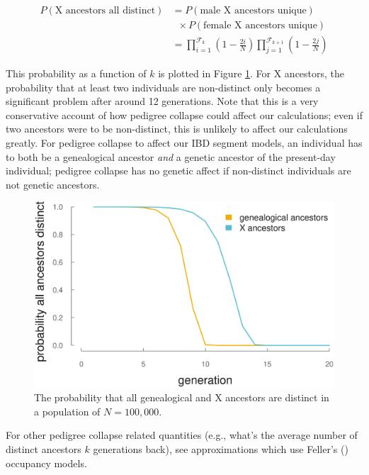 \documentclass[9pt,twocolumn,twoside]{gsajnl}
\begin{document}
\begin{align}
  P(\text{X ancestors all distinct}) &= P(\text{male X ancestors unique})  \\ \nonumber
  & \;\; \times P(\text{female X ancestors unique})\\ \nonumber
                                     &= \prod_{i=1}^{\mathcal{F}_{k}} \left(1-\frac{2i}{N}\right)\prod_{j=1}^{\mathcal{F}_{k+1}} \left(1-\frac{2j}{N}\right)
\end{align}

This probability as a function of $k$ is plotted in Figure
\ref{fig:ped-collapse}. For X ancestors, the probability that at least two
individuals are non-distinct only becomes a significant problem after around 12
generations. Note that this is a very conservative account of how pedigree
collapse could affect our calculations; even if two ancestors were to be
non-distinct, this is unlikely to affect our calculations greatly. For pedigree
collapse to affect our IBD segment models, an individual has to both be a
genealogical ancestor \emph{and} a genetic ancestor of the present-day
individual; pedigree collapse has no genetic affect if non-distinct individuals
are not genetic ancestors.

\begin{figure}[!ht]
  \centering
  \includegraphics[width=\linewidth]{images/ped-collapse}
  \caption{The probability that all genealogical and X ancestors are distinct in a population of $N=100,000$.}
  \label{fig:ped-collapse}
\end{figure}

For other pedigree collapse related quantities (e.g., what's the average number
of distinct ancestors $k$ generations back), see
\citet{wachter2013statistical} approximations which use Feller's
(\citeyear{feller1950introduction}) occupancy models.
\end{document}
